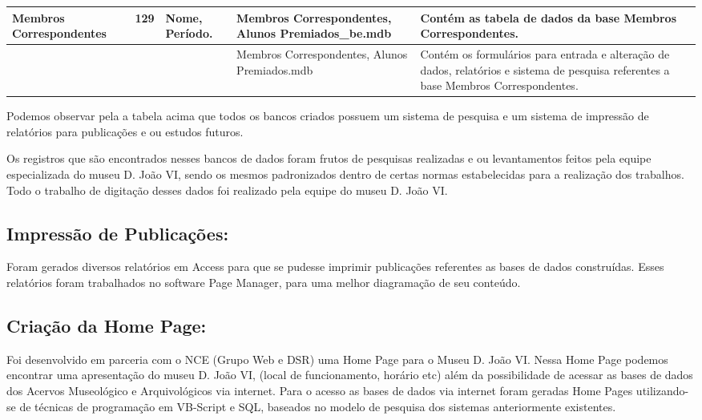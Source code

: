\begin{center}
	\begin{tabular}{|p{2cm} | p{2.3cm} | p{3.7cm} | p{3cm} | p{3.5cm} |} 
		\hline
		Membros Correspondentes & 129 & Nome, Período. & Membros Correspondentes, Alunos Premiados\_be.mdb & Contém as tabela de dados da base Membros Correspondentes.\\
		\hline
		&  &  & Membros Correspondentes, Alunos Premiados.mdb & Contém os formulários para entrada e alteração de dados, relatórios e sistema de pesquisa referentes a base Membros Correspondentes.\\
		\hline 	
	\end{tabular}
\end{center}

Podemos observar pela a tabela acima que todos os bancos criados possuem um sistema de pesquisa e um sistema de impressão de relatórios para publicações e ou estudos futuros.

Os registros que são encontrados nesses bancos de dados foram frutos de pesquisas realizadas e ou levantamentos feitos pela equipe especializada do museu D. João VI, sendo os mesmos padronizados dentro de certas normas estabelecidas para a realização dos trabalhos. Todo o trabalho de digitação desses dados foi realizado pela equipe do museu D. João VI.

\subsection{Impressão de Publicações:}

Foram gerados diversos relatórios em Access para que se pudesse imprimir publicações referentes as bases de dados construídas. Esses relatórios foram trabalhados no software Page Manager, para uma melhor diagramação de seu conteúdo.

\subsection{Criação da Home Page:}

Foi desenvolvido em parceria com o NCE (Grupo Web e DSR) uma Home Page para o Museu D. João VI. Nessa Home Page podemos encontrar uma apresentação do museu D. João VI, (local de funcionamento, horário etc) além da possibilidade de acessar as bases de dados dos Acervos Museológico e Arquivológicos via internet. Para o acesso as bases de dados via internet foram geradas Home Pages utilizando-se de técnicas de programação em VB-Script e SQL, baseados no modelo de pesquisa dos sistemas anteriormente existentes.

